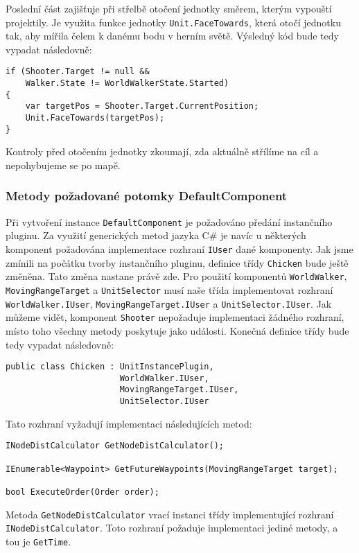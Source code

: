 Poslední část zajišťuje při střelbě otočení jednotky směrem, kterým vypouští projektily. Je využita funkce jednotky \texttt{Unit.FaceTowards}, která otočí jednotku tak, aby mířila čelem k danému bodu v herním světě. Výsledný kód bude tedy vypadat následovně:

\begin{lstlisting}
if (Shooter.Target != null && 
	Walker.State != WorldWalkerState.Started) 
{
	var targetPos = Shooter.Target.CurrentPosition;
	Unit.FaceTowards(targetPos);
}
\end{lstlisting}

Kontroly před otočením jednotky zkoumají, zda aktuálně střílíme na cíl a nepohybujeme se po mapě.

\subsubsection{Metody požadované potomky DefaultComponent}
Při vytvoření instance \texttt{DefaultComponent} je požadováno předání instančního pluginu. Za využití generických metod jazyka C\# je navíc u některých komponent požadována implementace rozhraní \texttt{IUser} dané komponenty. Jak jsme zmínili na počátku tvorby instančního pluginu, definice třídy \texttt{Chicken} bude ještě změněna. Tato změna nastane právě zde. Pro použití komponentů \texttt{WorldWalker}, \texttt{MovingRangeTarget} a \texttt{UnitSelector} musí naše třída implementovat rozhraní \texttt{WorldWalker.IUser}, \texttt{MovingRangeTarget.IUser} a \texttt{UnitSelector.IUser}. Jak můžeme vidět, komponent \texttt{Shooter} nepožaduje implementaci žádného rozhraní, místo toho všechny metody poskytuje jako události. Konečná definice třídy bude tedy vypadat následovně:

\begin{lstlisting}
public class Chicken : UnitInstancePlugin, 
					   WorldWalker.IUser, 
					   MovingRangeTarget.IUser,
					   UnitSelector.IUser
\end{lstlisting}

Tato rozhraní vyžadují implementaci následujících metod:
\begin{lstlisting}
INodeDistCalculator GetNodeDistCalculator();

IEnumerable<Waypoint> GetFutureWaypoints(MovingRangeTarget target);

bool ExecuteOrder(Order order);
\end{lstlisting}

Metoda \texttt{GetNodeDistCalculator} vrací instanci třídy implementující rozhraní \texttt{INodeDistCalculator}. Toto rozhraní požaduje implementaci jediné metody, a tou je \texttt{GetTime}.

